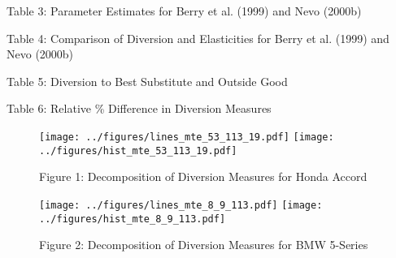 \documentclass[6pt,twoside]{article}
\begin{document}
\begin{table}[htp]
\footnotesize
\caption*{Table 3: Parameter Estimates for Berry et al. (1999) and Nevo (2000b)}
\begin{center}

\end{center}

\end{table}%



\begin{table}[htp]
\footnotesize
\caption*{Table 4: Comparison of Diversion and Elasticities for Berry et al. (1999) and Nevo (2000b)}
\begin{center}

\end{center}
\end{table}%



\begin{table}[htp]
\footnotesize
\caption*{Table 5: Diversion to Best Substitute and Outside Good}
\begin{center}

\end{center}
\end{table}%


\begin{table}[htp]
\footnotesize
\caption*{Table 6: Relative \% Difference in Diversion Measures}
\begin{center}

\end{center}
\end{table}



\begin{figure}[htbp]
\begin{center}
\caption*{Figure 1: Decomposition of Diversion Measures for Honda Accord}
\texttt{[image: ../figures/lines\_mte\_53\_113\_19.pdf]}
\texttt{[image: ../figures/hist\_mte\_53\_113\_19.pdf]}
\end{center}
\end{figure}


\begin{figure}[htbp]
\begin{center}
\caption*{Figure 2: Decomposition of Diversion Measures for BMW 5-Series}
\texttt{[image: ../figures/lines\_mte\_8\_9\_113.pdf]}
\texttt{[image: ../figures/hist\_mte\_8\_9\_113.pdf]}
\end{center}
\end{figure}
\end{document}
